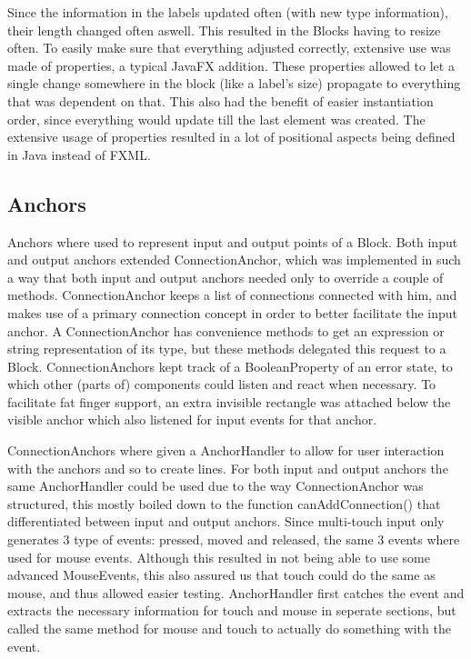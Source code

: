 Since the information in the labels updated often (with new type information), their length changed often aswell. This resulted in the Blocks having to resize often. To easily make sure that everything adjusted correctly, extensive use was made of properties, a typical JavaFX addition. These properties allowed to let a single change somewhere in the block (like a label's size) propagate to everything that was dependent on that. This also had the benefit of easier instantiation order, since everything would update till the last element was created. The extensive usage of properties resulted in a lot of positional aspects being defined in Java instead of FXML.

\subsection{Anchors}
Anchors where used to represent input and output points of a Block. Both input and output anchors extended ConnectionAnchor, which was implemented in such a way that both input and output anchors needed only to override a couple of methods. ConnectionAnchor keeps a list of connections connected with him, and makes use of a primary connection concept in order to better facilitate the input anchor. A ConnectionAnchor has convenience methods to get an expression or string representation of its type, but these methods delegated this request to a Block. ConnectionAnchors kept track of a BooleanProperty of an error state, to which other (parts of) components could listen and react when necessary. To facilitate fat finger support, an extra invisible rectangle was attached below the visible anchor which also listened for input events for that anchor.

ConnectionAnchors where given a AnchorHandler to allow for user interaction with the anchors and so to create lines. For both input and output anchors the same AnchorHandler could be used due to the way ConnectionAnchor was structured, this mostly boiled down to the function canAddConnection() that differentiated between input and output anchors. Since multi-touch input only generates 3 type of events: pressed, moved and released, the same 3 events where used for mouse events. Although this resulted in not being able to use some advanced MouseEvents, this also assured us that touch could do the same as mouse, and thus allowed easier testing. AnchorHandler first catches the event and extracts the necessary information for touch and mouse in seperate sections, but called the same method for mouse and touch to actually do something with the event.

